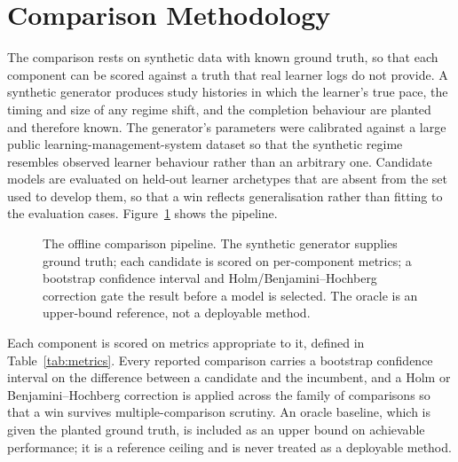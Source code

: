 \section{Comparison Methodology}
The comparison rests on synthetic data with known ground truth, so that each component can be scored against a truth that real learner logs do not provide. A synthetic generator produces study histories in which the learner's true pace, the timing and size of any regime shift, and the completion behaviour are planted and therefore known. The generator's parameters were calibrated against a large public learning-management-system dataset so that the synthetic regime resembles observed learner behaviour rather than an arbitrary one. Candidate models are evaluated on held-out learner archetypes that are absent from the set used to develop them, so that a win reflects generalisation rather than fitting to the evaluation cases. Figure~\ref{fig:pipeline} shows the pipeline.

\begin{figure}[htbp]
\centering
{}
\caption{The offline comparison pipeline. The synthetic generator supplies ground truth; each candidate is scored on per-component metrics; a bootstrap confidence interval and Holm/Benjamini--Hochberg correction gate the result before a model is selected. The oracle is an upper-bound reference, not a deployable method.}
\label{fig:pipeline}
\end{figure}

Each component is scored on metrics appropriate to it, defined in Table~\ref{tab:metrics}. Every reported comparison carries a bootstrap confidence interval on the difference between a candidate and the incumbent, and a Holm or Benjamini--Hochberg correction is applied across the family of comparisons so that a win survives multiple-comparison scrutiny. An oracle baseline, which is given the planted ground truth, is included as an upper bound on achievable performance; it is a reference ceiling and is never treated as a deployable method.

